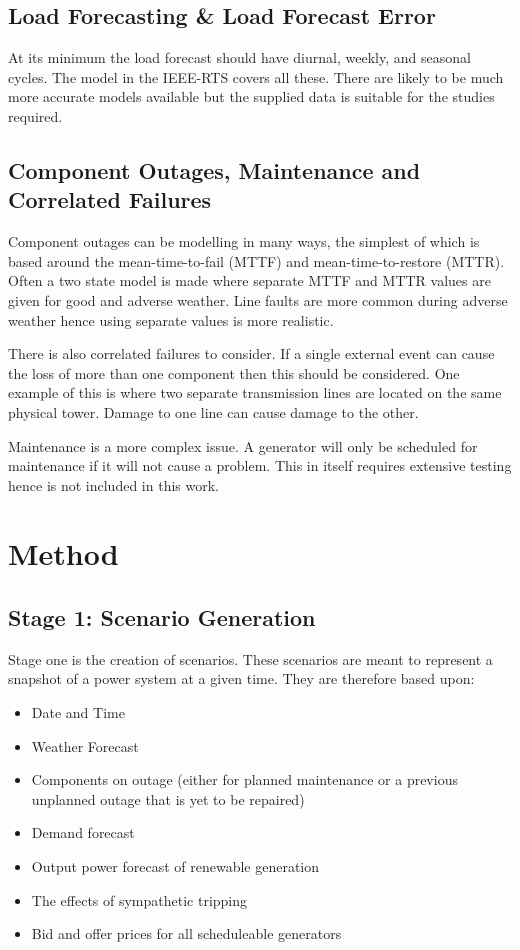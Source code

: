 \documentclass[a4paper,oneside,12pt]{report}
\begin{document}
\subsection{Load Forecasting \& Load Forecast Error}

At its minimum the load forecast should have diurnal, weekly, and seasonal cycles. The model in the IEEE-RTS covers all these. There are likely to be much more accurate models available but the supplied data is suitable for the studies required.

\subsection{Component Outages, Maintenance and Correlated Failures}

Component outages can be modelling in many ways, the simplest of which is based around the mean-time-to-fail (MTTF) and mean-time-to-restore (MTTR). Often a two state model is made where separate MTTF and MTTR values are given for good and adverse weather. Line faults are more common during adverse weather hence using separate values is more realistic.

There is also correlated failures to consider. If a single external event can cause the loss of more than one component then this should be considered. One example of this is where two separate transmission lines are located on the same physical tower. Damage to one line can cause damage to the other.

Maintenance is a more complex issue. A generator will only be scheduled for maintenance if it will not cause a problem. This in itself requires extensive testing hence is not included in this work.

\section{Method}
\subsection{Stage 1: Scenario Generation}

Stage one is the creation of scenarios. These scenarios are meant to represent a snapshot of a power system at a given time. They are therefore based upon:

\begin{itemize}
\item Date and Time
\item Weather Forecast
\item Components on outage (either for planned maintenance or a previous unplanned outage that is yet to be repaired)
\item Demand forecast
\item Output power forecast of renewable generation
\item The effects of sympathetic tripping
\item Bid and offer prices for all scheduleable generators
\end{itemize}
\end{document}
